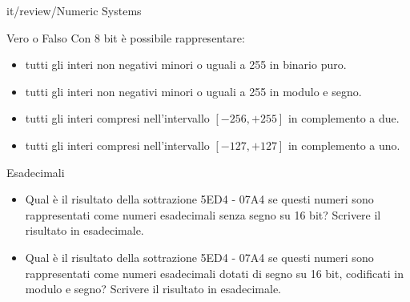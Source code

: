 \documentclass[11pt]{article}
\begin{document}
\begin{quiz}{it/review/Numeric Systems}
\begin{cloze}[points=1,shuffle=false]{Vero o Falso}
Con 8 bit è possibile rappresentare:
\begin{itemize}
\item tutti gli interi non negativi minori o uguali a 255 in binario puro.
\item tutti gli interi non negativi minori o uguali a 255 in modulo e segno.
\item tutti gli interi compresi nell'intervallo $[-256,+255]$ in complemento a due.
\item tutti gli interi compresi nell'intervallo $[-127,+127]$ in complemento a uno.
\end{itemize}
\end{cloze}

\begin{cloze}[points=1,shuffle=false]{Esadecimali}
\begin{itemize}
\item Qual è il risultato della sottrazione 5ED4 - 07A4 se questi numeri sono rappresentati come numeri esadecimali senza segno su 16 bit? Scrivere il risultato in esadecimale.
\item Qual è il risultato della sottrazione 5ED4 - 07A4 se questi numeri sono rappresentati come numeri esadecimali dotati di segno su 16 bit, codificati in modulo e segno? Scrivere il risultato in esadecimale.
\end{itemize}
\end{cloze}


\end{quiz}
\end{document}
